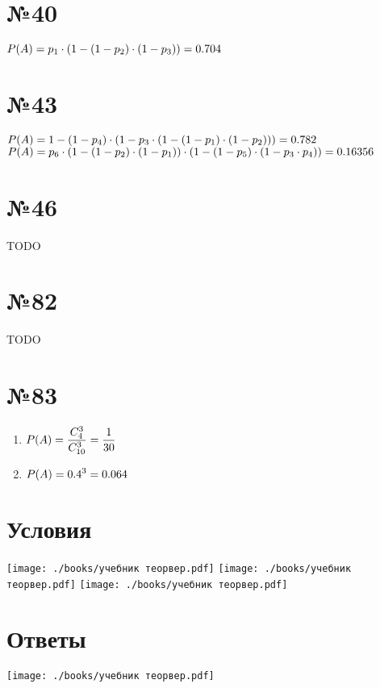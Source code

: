 \documentclass{article}
\newcommand{\hr}{\par\vspace{.5\baselineskip}\noindent\hrulefill\par}
\begin{document}
  \section*{№40}
  $\displaystyle P(A) = p_1 \cdot \left(1 - \left(1 - p_2\right)\cdot\left(1 - p_3\right)\right) = 0.704$

  \section*{№43}
  $\displaystyle P(A) = 1 - \left(1 - p_4\right)\cdot\left(1 - p_3 \cdot \left(1 - \left(1 - p_1\right)\cdot\left(1 - p_2\right)\right)\right) = 0.782$ \\
  $\displaystyle P(A) = p_6 \cdot \left(1 - \left(1 - p_2\right)\cdot\left(1 - p_1\right)\right) \cdot \left(1 - \left(1 - p_5\right)\cdot\left(1 - p_3\cdot p_4\right)\right) = 0.16356$

  \section*{№46}
  TODO

  \section*{№82}
  TODO

  \section*{№83}
  \begin{enumerate}[label=\realasbuk*)]
    \item $\displaystyle P(A) = \frac{C^3_4}{C^3_{10}} = \frac{1}{30}$
    \item $\displaystyle P(A) = 0.4^3 = 0.064$
  \end{enumerate}

  \hr
  \section*{Условия}
  \texttt{[image: ./books/учебник теорвер.pdf]} \hfill
  \texttt{[image: ./books/учебник теорвер.pdf]} \hfill
  \texttt{[image: ./books/учебник теорвер.pdf]} \hfill

  \section*{Ответы}
  \begin{center}
    \texttt{[image: ./books/учебник теорвер.pdf]}
  \end{center}
\end{document}
